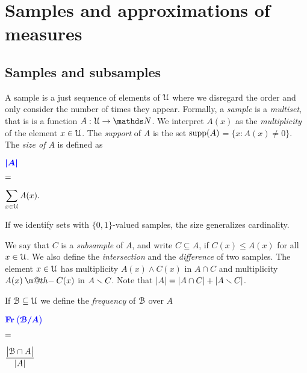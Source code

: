 \documentclass[sputnik.tex]{subfiles}
\begin{document}
\def\Fr{\mathop{\rm Fr}}

\def\vc{{\footnotesize VC}}
\def\nip{{\footnotesize NIP}}


\def\medrel#1{\parbox[t]{6ex}{$\displaystyle\hfil #1$}}
\def\ceq#1#2#3{\parbox[t]{25ex}{$\displaystyle #1$}\medrel{#2}{$\displaystyle #3$}}



\chapter{Samples and approximations of measures}


\section{Samples and subsamples}\label{multisets}

\def\ceq#1#2#3{\parbox[t]{32ex}{$\displaystyle #1$}\parbox{5ex}{$\displaystyle\hfil #2$}{$\displaystyle #3$}}

A sample is a just sequence of elements of $\EuScript U$ where we disregard the order and only consider the number of times they appear.
Formally, a \emph{sample\/} is a \emph{multiset}, that is is a function $A:\U\to\NN$.
We interpret $A(x)$ as the \emph{multiplicity\/} of the element $x\in\EuScript U$.
The \emph{support\/} of $A$ is the set \emph{$\mathop{\rm supp}(A)$}$=\{x:A(x)\neq0\}$.
The \emph{size of $A$\/} is defined as

\ceq{\hfill\emph{$|A|$}}{=}{\sum_{x\in\U} A(x).}

If we identify sets with $\{0,1\}$-valued samples, the size generalizes cardinality. 

\makeatletter
\def\dotminus{\mathbin{\ooalign{\hidewidth\raise1ex\hbox{.}\hidewidth\cr$\m@th-$\cr}}}
\makeatother

We say that $C$ is a \emph{subsample\/} of $A$, and write \emph{$C\subseteq A$}, if $C(x)\le A(x)$ for all $x\in\EuScript U$.
We also define the \emph{intersection\/} and the \emph{difference\/} of two samples.
The element $x\in\EuScript U$ has multiplicity  $A(x)\wedge C(x)$ in \emph{$A\cap C$\/} and multiplicity  $A(x)\dotminus C(x)$ in \emph{$A\smallsetminus C$}.
Note that $|A|=|A\cap C|+|A\smallsetminus C|$.

If $\EuScript B\subseteq\EuScript U$ we define the \emph{frequency\/} of $\EuScript B$ over $A$

\ceq{\hfill\emph{$\Fr\big(\B/A\big)$}}{=}{\frac{\big|\B\cap A\big|}{|A|}}
\end{document}
